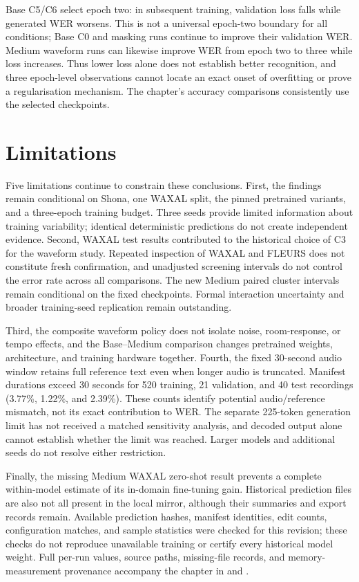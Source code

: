 \documentclass[12pt,a4paper]{report}
\begin{document}
Base C5/C6 select epoch two: in subsequent training, validation loss falls
while generated WER worsens. This is not a universal epoch-two boundary
for all conditions; Base C0 and masking runs continue to improve their
validation WER. Medium waveform runs can likewise improve WER from epoch
two to three while loss increases. Thus lower loss alone does not establish
better recognition, and three epoch-level observations cannot locate an
exact onset of overfitting or prove a regularisation mechanism. The chapter's
accuracy comparisons consistently use the selected checkpoints.

\section{Limitations}

Five limitations continue to constrain these conclusions. First, the findings
remain conditional on Shona, one WAXAL split, the pinned pretrained variants,
and a three-epoch training budget. Three seeds provide limited information
about training variability; identical deterministic predictions do not create
independent evidence. Second, WAXAL test results contributed to the historical
choice of C3 for the waveform study. Repeated inspection of WAXAL and FLEURS
does not constitute fresh confirmation, and unadjusted screening intervals
do not control the error rate across all comparisons. The new Medium paired cluster intervals remain conditional on the fixed
checkpoints. Formal interaction uncertainty and broader training-seed
replication remain outstanding.

Third, the composite waveform policy does not isolate noise, room-response,
or tempo effects, and the Base--Medium comparison changes pretrained weights,
architecture, and training hardware together. Fourth, the fixed 30-second
audio window retains full reference text even when longer audio is truncated.
Manifest durations exceed 30 seconds for 520 training, 21 validation, and
40 test recordings (3.77\%, 1.22\%, and 2.39\%). These counts identify
potential audio/reference mismatch, not its exact contribution to WER.
The separate 225-token generation limit has not received a matched sensitivity
analysis, and decoded output alone cannot establish whether the limit was
reached. Larger models and additional seeds do not resolve either restriction.

Finally, the missing Medium WAXAL zero-shot result prevents a complete
within-model estimate of its in-domain fine-tuning gain. Historical prediction
files are also not all present in the local mirror, although their summaries
and export records remain. Available prediction hashes, manifest identities,
edit counts, configuration matches, and sample statistics were checked for
this revision; these checks do not reproduce unavailable training or certify
every historical model weight. Full per-run values, source paths, missing-file
records, and memory-measurement provenance accompany the chapter in
 and .
\end{document}
